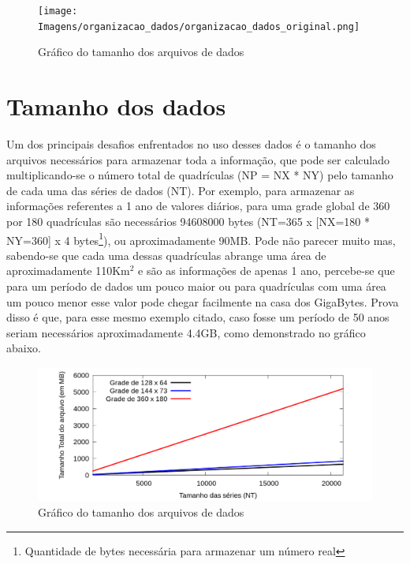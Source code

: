 \begin{figure}[H]
\centering
\texttt{[image: Imagens/organizacao\_dados/organizacao\_dados\_original.png]}
\caption{Gráfico do tamanho dos arquivos de dados}
\label{fig:organizacao_dados_original}
\end{figure}

\section{Tamanho dos dados}

Um dos principais desafios enfrentados no uso desses dados é o tamanho dos arquivos necessários para armazenar toda a informação, que pode ser calculado multiplicando-se o número total de quadrículas (NP = NX * NY) pelo tamanho de cada uma das séries de dados (NT). Por exemplo, para armazenar as informações referentes a 1 ano de valores diários, para uma grade global de 360 por 180 quadrículas são necessários 94608000 bytes (NT=365 x [NX=180 * NY=360] x 4 bytes\footnote{Quantidade de bytes necessária para armazenar um número real}), ou aproximadamente 90MB. Pode não parecer muito mas, sabendo-se que cada uma dessas quadrículas abrange uma área de aproximadamente 110Km$^2$ e são as informações de apenas 1 ano, percebe-se que para um período de dados um pouco maior ou para quadrículas com uma área um pouco menor esse valor pode chegar facilmente na casa dos GigaBytes. Prova disso é que, para esse mesmo exemplo citado, caso fosse um período de 50 anos seriam necessários aproximadamente 4.4GB, como demonstrado no gráfico abaixo.

\begin{figure}[H]
\centering
\includegraphics[width=1.0\textwidth]{Imagens/tamanho_dados/serie_tam_dados.png}
\caption{Gráfico do tamanho dos arquivos de dados}
\label{fig:grafico_tamanho_dados}
\end{figure}
